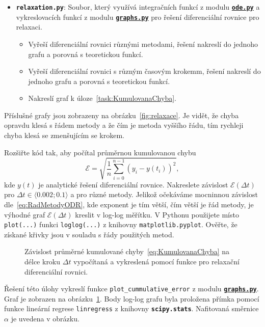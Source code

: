\documentclass[a4paper,11pt,twoside]{article}
\def\code#1{\textnormal{\texttt{#1}}}
\def\file#1{\textnormal{\textbf{\texttt{#1}}}}
\def\ghfile#1#2{\textnormal{\textbf{\texttt{\href{https://github.com/PavelStransky/PCInPhysics/blob/main/#1#2}{#2}}}}}
\theoremstyle{red}
\theoremstyle{green}
\begin{document}
\begin{solution}
\begin{itemize}
    \item \file{relaxation.py}:
        Soubor, který využívá integračních funkcí z modulu \ghfile{python/ode/}{ode.py} a vykreslovacích funkcí z modulu \ghfile{python/ode/}{graphs.py}
        pro řešení diferenciální rovnice pro relaxaci.
        \begin{itemize}
        \item Vyřeší diferenciální rovnici různými metodami, řešení nakreslí do jednoho grafu a porovná s teoretickou funkcí.
        \item Vyřeší diferenciální rovnici s různým časovým krokemm, řešení nakreslí do jednoho grafu a porovná s teoretickou funkcí.
        \item Nakreslí graf k úloze~\ref{task:KumulovanaChyba}.
        \end{itemize}
    \end{itemize}

    Příslušné grafy jsou zobrazeny na obrázku~\ref{fig:relaxace}.
    Je vidět, že chyba opravdu klesá s řádem metody a že čím je metoda vyššího řádu, tím rychleji chyba klesá se zmenšujícím se krokem.
\end{solution}

\begin{solved}
\label{task:KumulovanaChyba}
    Rozšiřte kód tak, aby počítal průměrnou kumulovanou chybu
    \begin{equation}\label{eq:KumulovanaChyba}
        \mathcal{E}=\sqrt{\frac{1}{n}\sum_{i=0}^{n-1}\left(y_{i}-y(t_{i})\right)^{2}},
    \end{equation}
    kde $y(t)$ je analytické řešení diferenciální rovnice.
    Nakreslete závislost $\mathcal{E}(\Delta t)$ pro $\Delta t\in\langle0.002;0.1\rangle$ a pro různé metody.
    Jelikož očekáváme mocninnou závislost dle~\eqref{eq:RadMetodyODR}, kde exponent je tím větší, čím větší je řád metody, je výhodné graf $\mathcal{E}(\Delta t)$ kreslit v log-log měřítku.
    V Pythonu použijete místo \textnormal{\texttt{plot(...)}} funkci \textnormal{\texttt{loglog(...)}} z knihovny \textnormal{\texttt{matplotlib.pyplot}}.
    Ověřte, že získané křivky jsou v souladu s řády použitých metod.
\end{solved}

\begin{solution}
    \begin{figure}[!htb]
        \centering{}
        \caption{
            \protect\small
            Závislost průměrné kumulované chyby~\eqref{eq:KumulovanaChyba} na délce kroku $\Delta t$ vypočítaná a vykreslená pomocí funkce pro relaxační diferenciální rovnici.
        }
        \label{fig:relaxace_chyba}
    \end{figure}

    Řešení této úlohy vykreslí funkce \code{plot_cummulative_error} z modulu \ghfile{python/ode/}{graphs.py}. Graf je zobrazen na obrázku~\ref{fig:relaxace_chyba}.
    Body log-log grafu byla proložena přímka pomocí funkce lineární regrese \code{linregress} z knihovny \file{scipy.stats}.
    Nafitovaná směrnice $\alpha$ je uvedena v obrázku.
\end{solution}
\end{document}
